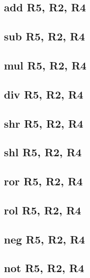 \documentclass{article}
\begin{document}
    \subsection{add R5, R2, R4} \label{ADD}
        
    \subsection{sub R5, R2, R4} \label{SUB}
        
    \subsection{mul R5, R2, R4} \label{MUL}
        
    \subsection{div R5, R2, R4} \label{DIV}
        
    \subsection{shr R5, R2, R4} \label{SHR}
        
    \subsection{shl R5, R2, R4} \label{SHL}
        
    \subsection{ror R5, R2, R4} \label{ROR}
        
    \subsection{rol R5, R2, R4} \label{ROL}
        
    \subsection{neg R5, R2, R4} \label{NEG}
        
    \subsection{not R5, R2, R4} \label{NOT}
        
\end{document}
